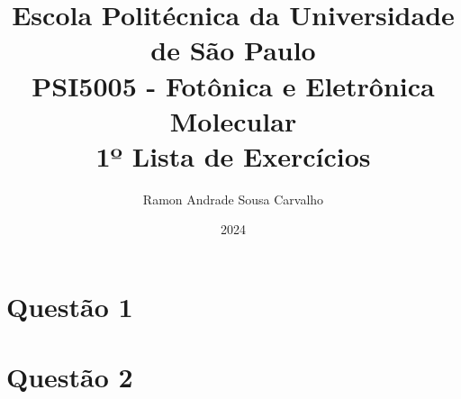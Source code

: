 \documentclass[12pt,twoside]{article}
\title{
{\large Escola Politécnica da Universidade de São Paulo}\\
\vspace*{1.0cm}
{\small PSI5005 - Fotônica e Eletrônica Molecular}\\
{1º Lista de Exercícios}
\vspace*{1.0cm}
}
\author{
	Ramon Andrade Sousa Carvalho
}
\date{2024}
\begin{document}
\maketitle

\section*{Questão 1}


\section*{Questão 2}

\end{document}
